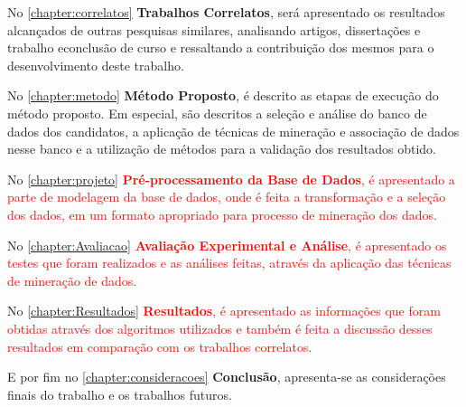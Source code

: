 \par
No \autoref{chapter:correlatos} \textbf{Trabalhos Correlatos}, será apresentado os resultados alcançados de outras pesquisas similares, analisando artigos, dissertações e trabalho econclusão de curso e ressaltando a contribuição dos mesmos para o desenvolvimento deste trabalho.

\par
No \autoref{chapter:metodo} \textbf{Método Proposto}, é descrito as etapas de execução do método proposto. Em especial, são descritos a seleção e análise do banco de dados dos candidatos, a aplicação de técnicas de mineração e associação de dados nesse banco e a utilização de métodos para a validação dos resultados obtido.

\par
No \autoref{chapter:projeto} \textcolor{red}{\textbf{Pré-processamento da Base de Dados}, é apresentado a parte de modelagem da base de dados, onde é feita a transformação e a seleção dos dados, em um formato apropriado para processo de mineração dos dados.}

\par
No \autoref{chapter:Avaliacao} \textcolor{red}{\textbf{Avaliação Experimental e Análise}, é apresentado os testes que foram realizados e as análises feitas, através da aplicação das técnicas de mineração de dados.} 

\par
No \autoref{chapter:Resultados} \textcolor{red}{\textbf{Resultados}, é apresentado as informações que foram obtidas através dos algoritmos utilizados e também é feita a discussão desses resultados em comparação com os trabalhos correlatos.}

\par
E por fim no \autoref{chapter:consideracoes} \textbf{Conclusão}, apresenta-se as considerações finais do trabalho e os trabalhos futuros. 
